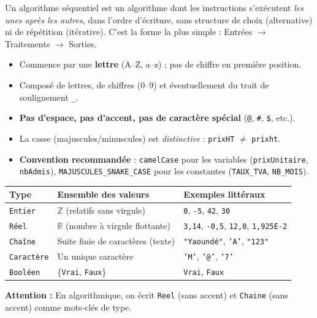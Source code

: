 \documentclass[11pt]{article}
\newcommand{\cle}[1]{{\popxbold\color{popdark}#1}}
\begin{document}
\begin{definition}
Un \cle{algorithme séquentiel} est un algorithme dont les instructions s'exécutent \emph{les unes après les autres}, dans l'ordre d'écriture, sans structure de choix (alternative) ni de répétition (itérative). C'est la forme la plus simple : Entrées $\rightarrow$ Traitements $\rightarrow$ Sorties.
\end{definition}

\begin{propriete}
\begin{itemize}
\item Commence par une \textbf{lettre} (A--Z, a--z) ; pas de chiffre en première position.
\item Composé de lettres, de chiffres (0--9) et éventuellement du trait de soulignement \texttt{\_}.
\item \textbf{Pas d'espace, pas d'accent, pas de caractère spécial} (\texttt{@}, \texttt{\#}, \texttt{\$}, etc.).
\item La \cle{casse} (majuscules/minuscules) est \emph{distinctive} : \texttt{prixHT} $\neq$ \texttt{prixht}.
\item \textbf{Convention recommandée} : \texttt{camelCase} pour les variables (\texttt{prixUnitaire}, \texttt{nbAdmis}), \texttt{MAJUSCULES\_SNAKE\_CASE} pour les constantes (\texttt{TAUX\_TVA}, \texttt{NB\_MOIS}).
\end{itemize}
\end{propriete}

\begin{propriete}
\begin{center}
\begin{tabularx}{\linewidth}{|l|X|l|}
\hline
\rowcolor{popblueL} \textbf{Type} & \textbf{Ensemble des valeurs} & \textbf{Exemples littéraux} \\
\hline
\texttt{Entier} & $\mathbb{Z}$ (relatifs sans virgule) & \texttt{0}, \texttt{-5}, \texttt{42}, \texttt{30} \\
\hline
\texttt{Réel} & $\mathbb{R}$ (nombre à virgule flottante) & \texttt{3,14}, \texttt{-0,5}, \texttt{12,0}, \texttt{1,925E-2} \\
\hline
\texttt{Chaîne} & Suite finie de caractères (texte) & \texttt{"Yaoundé"}, \texttt{'A'}, \texttt{"123"} \\
\hline
\texttt{Caractère} & Un unique caractère & \texttt{'M'}, \texttt{'@'}, \texttt{'7'} \\
\hline
\texttt{Booléen} & \{\texttt{Vrai}, \texttt{Faux}\} & \texttt{Vrai}, \texttt{Faux} \\
\hline
\end{tabularx}
\end{center}
\textbf{Attention :} En algorithmique, on écrit \texttt{Reel} (sans accent) et \texttt{Chaine} (sans accent) comme mots-clés de type.
\end{propriete}
\end{document}
